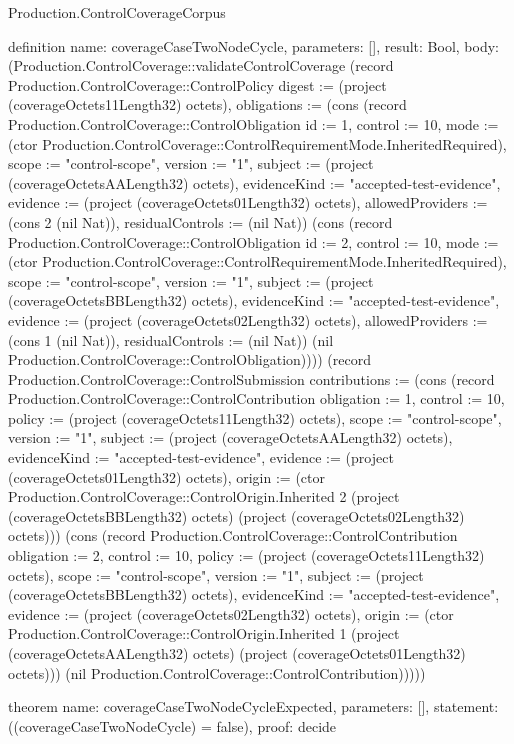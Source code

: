 \begin{lexlean}{Production.ControlCoverageCorpus}
\begin{semanticmodule}
definition{
  name: coverageCaseTwoNodeCycle,
  parameters: [],
  result: Bool,
  body: (Production.ControlCoverage::validateControlCoverage (record Production.ControlCoverage::ControlPolicy {digest := (project (coverageOctets11Length32) octets), obligations := (cons (record Production.ControlCoverage::ControlObligation {id := 1, control := 10, mode := (ctor Production.ControlCoverage::ControlRequirementMode.InheritedRequired), scope := "control-scope", version := "1", subject := (project (coverageOctetsAALength32) octets), evidenceKind := "accepted-test-evidence", evidence := (project (coverageOctets01Length32) octets), allowedProviders := (cons 2 (nil Nat)), residualControls := (nil Nat)}) (cons (record Production.ControlCoverage::ControlObligation {id := 2, control := 10, mode := (ctor Production.ControlCoverage::ControlRequirementMode.InheritedRequired), scope := "control-scope", version := "1", subject := (project (coverageOctetsBBLength32) octets), evidenceKind := "accepted-test-evidence", evidence := (project (coverageOctets02Length32) octets), allowedProviders := (cons 1 (nil Nat)), residualControls := (nil Nat)}) (nil Production.ControlCoverage::ControlObligation)))}) (record Production.ControlCoverage::ControlSubmission {contributions := (cons (record Production.ControlCoverage::ControlContribution {obligation := 1, control := 10, policy := (project (coverageOctets11Length32) octets), scope := "control-scope", version := "1", subject := (project (coverageOctetsAALength32) octets), evidenceKind := "accepted-test-evidence", evidence := (project (coverageOctets01Length32) octets), origin := (ctor Production.ControlCoverage::ControlOrigin.Inherited 2 (project (coverageOctetsBBLength32) octets) (project (coverageOctets02Length32) octets))}) (cons (record Production.ControlCoverage::ControlContribution {obligation := 2, control := 10, policy := (project (coverageOctets11Length32) octets), scope := "control-scope", version := "1", subject := (project (coverageOctetsBBLength32) octets), evidenceKind := "accepted-test-evidence", evidence := (project (coverageOctets02Length32) octets), origin := (ctor Production.ControlCoverage::ControlOrigin.Inherited 1 (project (coverageOctetsAALength32) octets) (project (coverageOctets01Length32) octets))}) (nil Production.ControlCoverage::ControlContribution)))}))
}

theorem{
  name: coverageCaseTwoNodeCycleExpected,
  parameters: [],
  statement: ((coverageCaseTwoNodeCycle) = false),
  proof: decide{}
}


\end{semanticmodule}
\end{lexlean}
